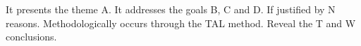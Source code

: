 It presents the theme A. It addresses the goals B, C and D. If justified by N reasons. Methodologically occurs through the TAL method. Reveal the T and W conclusions.

